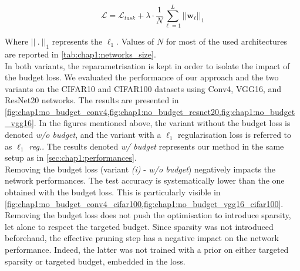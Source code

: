 \begin{equation}
  \label{eqn:chap1:globalloss_l1}
  \mathcal{L} = \mathcal{L}_{task} + \lambda \cdot \frac{1}{N} \sum_{\ell=1}^{L} || \mathbf{w}_\ell ||_1
\end{equation}

Where $||~.~||_1$ represents the $\ell_1$. Values of $N$ for most of the used
architectures are reported in \cref{tab:chap1:networks_size}.\\

In both variants, the reparametrisation is kept in order to isolate the impact
of the budget loss. We evaluated the performance of our approach and the two
variants on the CIFAR10 and CIFAR100 datasets using Conv4, VGG16, and ResNet20
networks. The results are presented in
\cref{fig:chap1:no_budget_conv4,fig:chap1:no_budget_resnet20,fig:chap1:no_budget_vgg16}.
In the figures mentioned above, the variant without the budget loss is denoted
\emph{w/o budget}, and the variant with a $\ell_1$ regularisation loss is
referred to as \emph{$\ell_1$ reg.}. The results denoted \emph{w/ budget}
represents our method in the same setup as in \cref{sec:chap1:performances}.\\

Removing the budget loss (variant \emph{(i)} - \emph{w/o budget}) negatively
impacts the network performances. The test accuracy is systematically lower than
the one obtained with the budget loss. This is particularly visible in
\cref{fig:chap1:no_budget_conv4_cifar100,fig:chap1:no_budget_vgg16_cifar100}.
Removing the budget loss does not push the optimisation to introduce sparsity,
let alone to respect the targeted budget. Since sparsity was not introduced
beforehand, the effective pruning step has a negative impact on the network
performance. Indeed, the latter was not trained with a prior on either targeted
sparsity or targeted budget, embedded in the loss.\\


